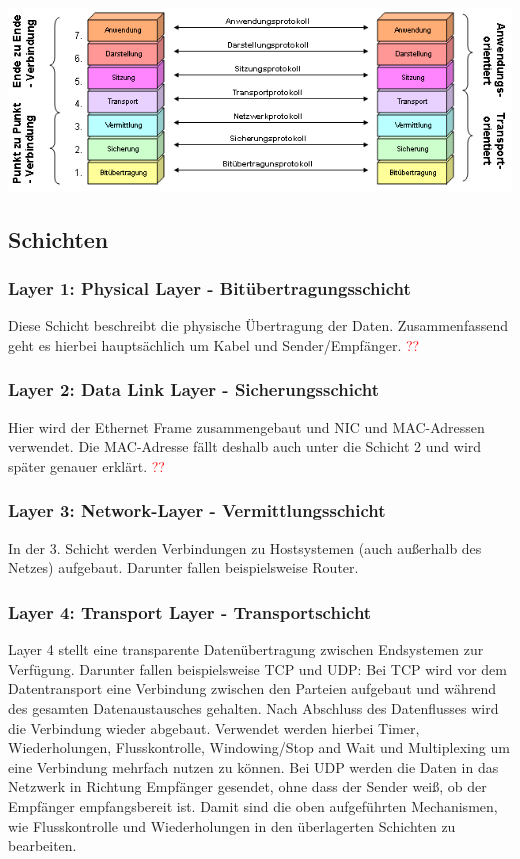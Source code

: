 \documentclass[12pt,a4paper]{article}
\begin{document}
			\includegraphics[scale=.75]{Bilder/OSI-Modell2} %

		\subsection{Schichten}
			\subsubsection{Layer 1: Physical Layer - Bitübertragungsschicht}
				Diese Schicht beschreibt die physische Übertragung der Daten. Zusammenfassend geht es hierbei hauptsächlich um Kabel und Sender/Empfänger. \textcolor{red}{??}

			\subsubsection{Layer 2: Data Link Layer - Sicherungsschicht}
				Hier wird der Ethernet Frame zusammengebaut und NIC und MAC-Adressen verwendet. Die MAC-Adresse fällt deshalb auch unter die Schicht 2 und wird später genauer erklärt. \textcolor{red}{??}

			\subsubsection{Layer 3: Network-Layer - Vermittlungsschicht}
				In der 3. Schicht werden Verbindungen zu Hostsystemen (auch außerhalb des Netzes) aufgebaut. Darunter fallen beispielsweise Router.

			\subsubsection{Layer 4: Transport Layer - Transportschicht}
				Layer 4 stellt eine transparente Datenübertragung zwischen Endsystemen zur Verfügung. Darunter fallen beispielsweise TCP und UDP:\newline\newline
				Bei TCP wird vor dem Datentransport eine Verbindung zwischen den Parteien aufgebaut und während des gesamten Datenaustausches gehalten. Nach Abschluss des Datenflusses wird die Verbindung wieder abgebaut. Verwendet werden hierbei Timer, Wiederholungen, Flusskontrolle, Windowing/Stop and Wait und Multiplexing um eine Verbindung mehrfach nutzen zu können.\newline\newline
				Bei UDP werden die Daten in das Netzwerk in Richtung Empfänger gesendet, ohne dass der Sender weiß, ob der Empfänger empfangsbereit ist. Damit sind die oben aufgeführten Mechanismen, wie Flusskontrolle und Wiederholungen in den überlagerten Schichten zu bearbeiten.
\end{document}
